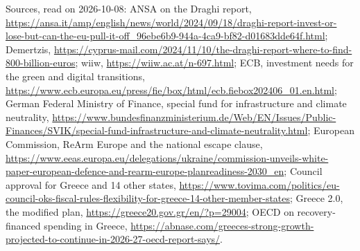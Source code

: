 \documentclass[11pt,a4paper]{article}
\begin{document}
\noindent Sources, read on 2026-10-08: ANSA on the Draghi report,
\url{https://ansa.it/amp/english/news/world/2024/09/18/draghi-report-invest-or-lose-but-can-the-eu-pull-it-off_96ebe6b9-944a-4ca9-bf82-d01683dde64f.html};
Demertzis, \url{https://cyprus-mail.com/2024/11/10/the-draghi-report-where-to-find-800-billion-euros};
wiiw, \url{https://wiiw.ac.at/n-697.html};
ECB, investment needs for the green and digital transitions,
\url{https://www.ecb.europa.eu/press/fie/box/html/ecb.fiebox202406_01.en.html};
German Federal Ministry of Finance, special fund for infrastructure and
climate neutrality,
\url{https://www.bundesfinanzministerium.de/Web/EN/Issues/Public-Finances/SVIK/special-fund-infrastructure-and-climate-neutrality.html};
European Commission, ReArm Europe and the national escape clause,
\url{https://www.eeas.europa.eu/delegations/ukraine/commission-unveils-white-paper-european-defence-and-rearm-europe-planreadiness-2030_en};
Council approval for Greece and 14 other states,
\url{https://www.tovima.com/politics/eu-council-oks-fiscal-rules-flexibility-for-greece-14-other-member-states};
Greece 2.0, the modified plan, \url{https://greece20.gov.gr/en/?p=29004};
OECD on recovery-financed spending in Greece,
\url{https://abnase.com/greeces-strong-growth-projected-to-continue-in-2026-27-oecd-report-says/}.
\end{document}
